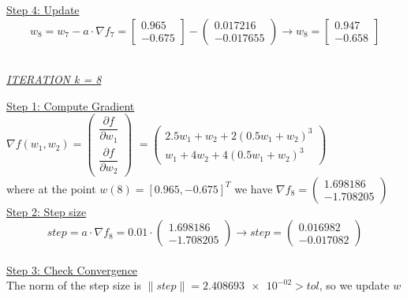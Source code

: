 \underline{Step 4: Update}
\[ 
w_8 = w_7 - a\cdot \nabla f_7 =  \left[\begin{array}{c}
	0.965\\
-0.675
\end{array}\right] - \left(\begin{array}{c}
0.017216 \\
-0.017655
\end{array}\right) \rightarrow
w_8 = \left[\begin{array}{c}
	0.947\\
	-0.658
\end{array}\right]
\]
\\[4mm]

\begin{center}
	\underline{\textit{ITERATION k = 8}}
\end{center}

\underline{Step 1: Compute Gradient}\\
\(\nabla f(w_1,w_2) = \left(\begin{array}{c}
	\dfrac{\partial f}{\partial w_1} \\[4mm]
	\dfrac{\partial f}{\partial w_2}
\end{array}\right)\) $= \left(\begin{array}{c}
	2.5w_1 + w_2 + 2(0.5w_1+w_2)^3\\[1mm]
	w_1 + 4w_2 + 4(0.5w_1+w_2)^3
\end{array}\right)$ \\[3mm]

where at the point $w\left(8\right) = \left[0.965, -0.675\right]^T$ we have $\nabla f_{8} = \left(\begin{array}{c}
	1.698186 \\
	-1.708205
\end{array}\right)$
\\[4mm]

\underline{Step 2: Step size}
\[
step = a \cdot \nabla f_{8} = 0.01 \cdot \left(\begin{array}{c}
	1.698186 \\
-1.708205
\end{array}\right) \rightarrow step =\left(\begin{array}{c}
	0.016982 \\
	-0.017082
\end{array}\right)
\]
\\[4mm]

\underline{Step 3: Check Convergence}\\
The norm of the step size is $\| step \| = \num{2.408693e-02} > tol$, so we update $w$
\\[4mm]

